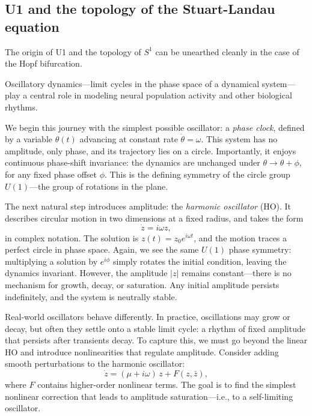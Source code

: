  
\subsection*{U1 and the topology of the Stuart-Landau equation}
\label{app:limitcycles}
The origin of U1 and the topology of $S^1$ can be unearthed cleanly in the case of the Hopf bifurcation.

Oscillatory dynamics---limit cycles in the phase space of a dynamical system---play a central role in modeling neural population activity and other biological rhythms. 


We begin this journey with the simplest possible oscillator: a \emph{phase clock}, defined by a variable $\theta(t)$ advancing at constant rate $\dot{\theta} = \omega$. This system has no amplitude, only phase, and its trajectory lies on a circle. Importantly, it enjoys continuous phase-shift invariance: the dynamics are unchanged under $\theta \to \theta + \phi$, for any fixed phase offset $\phi$. This is the defining symmetry of the circle group $U(1)$---the group of rotations in the plane.

The next natural step introduces amplitude: the \emph{harmonic oscillator} (HO). It describes circular motion in two dimensions at a fixed radius, and takes the form
\[
\dot z = i\omega z,
\]
in complex notation. The solution is $z(t) = z_0 e^{i\omega t}$, and the motion traces a perfect circle in phase space. Again, we see the same $U(1)$ phase symmetry: multiplying a solution by $e^{i\phi}$ simply rotates the initial condition, leaving the dynamics invariant. However, the amplitude $|z|$ remains constant---there is no mechanism for growth, decay, or saturation. Any initial amplitude persists indefinitely, and the system is neutrally stable.

Real-world oscillators behave differently. In practice, oscillations may grow or decay, but often they settle onto a stable limit cycle: a rhythm of fixed amplitude that persists after transients decay. To capture this, we must go beyond the linear HO and introduce nonlinearities that regulate amplitude. Consider adding smooth perturbations to the harmonic oscillator:
\[
\dot z = (\mu + i\omega)\,z + F(z,\bar z),
\]
where $F$ contains higher-order nonlinear terms. The goal is to find the simplest nonlinear correction that leads to amplitude saturation---i.e., to a self-limiting oscillator.

